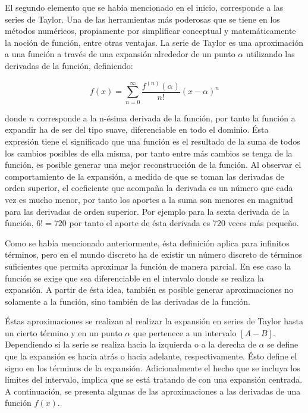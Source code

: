 \documentclass[letterpaper,10pt,oneside]{sphinxmanual}
\theoremstyle{plain}%
\theoremstyle{definition}%
\theoremstyle{remark}%
\begin{document}
El segundo elemento que se había mencionado en el inicio, corresponde a las series de Taylor. Una de las herramientas más poderosas que se tiene en los métodos numéricos, propiamente por simplificar conceptual y matemáticamente la noción de función, entre otras ventajas. La serie de Taylor es una aproximación a una función a través de una expansión alrededor de un punto $\alpha$ utilizando las derivadas de la función, definiendo:

\begin{equation}
f(x) = \sum\limits_{n=0}^{\infty}\frac{f^{(n)}(\alpha)}{n!}(x-\alpha)^n
\end{equation}

donde $n$ corresponde a la n-ésima derivada de la función, por tanto la función a expandir ha de ser del tipo suave, diferenciable en todo el dominio. Ésta expresión tiene el significado que una función es el resultado de la suma de todos los cambios posibles de ella misma, por tanto entre más cambios se tenga de la función, es posible generar una mejor reconstrucción de la función. Al observar el comportamiento de la expansión, a medida de que se toman las derivadas de orden superior, el coeficiente que acompaña la derivada es un número que cada vez es mucho menor, por tanto los aportes a la suma son menores en magnitud para las derivadas de orden superior. Por ejemplo para la sexta derivada de la función, $6! = 720$ por tanto el aporte de ésta derivada es $720$ veces más pequeño.

Como se había mencionado anteriormente, ésta definición aplica para infinitos términos, pero en el mundo discreto ha de existir un número discreto de términos suficientes que permita aproximar la función de manera parcial. En ese caso la función se exige que sea diferenciable en el intervalo donde se realiza la expansión. A partir de ésta idea, también es posible generar aproximaciones no solamente a la función, sino también de las derivadas de la función.

Éstas aproximaciones se realizan al realizar la expansión en series de Taylor hasta un cierto término y en un punto $\alpha$ que pertenece a un intervalo $[A-B]$. Dependiendo si la serie se realiza hacia la izquierda o a la derecha de $\alpha$ se define que la expansión es hacia atrás o hacia adelante, respectivamente. Ésto define el signo en los términos de la expansión. Adicionalmente el hecho que se incluya los límites del intervalo, implica que se está tratando de con una expansión centrada. A continuación, se presenta algunas de las aproximaciones a las derivadas de una función $f(x)$.
\end{document}
